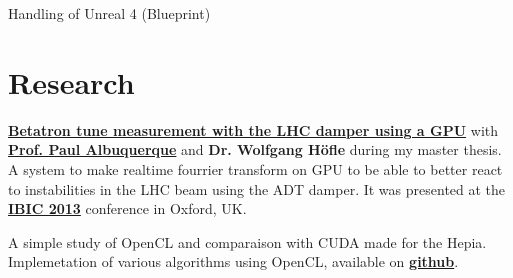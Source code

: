 \documentclass[a4paper]{deedy-resume} %
\begin{document}
\begin{minipage}[t]{0.66\textwidth}

	\begin{tightitemize}
		\item Handling of Unreal 4 (Blueprint)
	\end{tightitemize}

\sectionspace



\section{Research}

	\textbf{\href{http://cds.cern.ch/record/1545785?ln=en}
		{Betatron tune measurement with the LHC damper using a GPU}}
	with
	\textbf{\href{http://ch.linkedin.com/pub/paul-albuquerque/12/366/809}
		{Prof. Paul Albuquerque}}
	and \textbf{Dr. Wolfgang Höf\/le} during my master thesis.
	A system to make realtime fourrier transform
	on GPU to be able to better react to instabilities in the LHC beam using the ADT
	damper. It was presented at the
	\textbf{\href{http://www.ibic2013.org}{IBIC 2013}}
	conference in Oxford, UK.

\sectionspace %


	A simple study of OpenCL and comparaison with CUDA made for the Hepia. Implemetation
	of various algorithms using OpenCL, available on
	\textbf{\href{https://github.com/anirul/OpenCL\_PA\_2012}{github}}.

\sectionspace

\end{minipage}%
\hfill%
%
%
\end{document}
